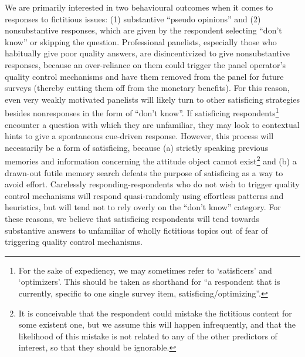 \documentclass[Royal,times,sageh]{sagej}
\begin{document}
We are primarily interested in two behavioural outcomes when it comes to
responses to fictitious issues: (1) substantive ``pseudo opinions'' and
(2) nonsubstantive responses, which are given by the respondent
selecting ``don't know'' or skipping the question. Professional
panelists, especially those who habitually give poor quality answers,
are disincentivized to give nonsubstantive responses, because an
over-reliance on them could trigger the panel operator's quality control
mechanisms and have them removed from the panel for future surveys
(thereby cutting them off from the monetary benefits). For this reason,
even very weakly motivated panelists will likely turn to other
satisficing strategies besides nonresponses in the form of ``don't
know''. If satisficing respondents\footnote{For the sake of expediency,
  we may sometimes refer to `satisficers' and `optimizers'. This should
  be taken as shorthand for ``a respondent that is currently, specific
  to one single survey item, satisficing/optimizing''.} encounter a
question with which they are unfamiliar, they may look to contextual
hints to give a spontaneous cue-driven response. However, this process
will necessarily be a form of satisficing, because (a) strictly speaking
previous memories and information concerning the attitude object cannot
exist\footnote{It is conceivable that the respondent could mistake the
  fictitious content for some existent one, but we assume this will
  happen infrequently, and that the likelihood of this mistake is not
  related to any of the other predictors of interest, so that they
  should be ignorable.} and (b) a drawn-out futile memory search defeats
the purpose of satisficing as a way to avoid effort. Carelessly
responding-respondents who do not wish to trigger quality control
mechanisms will respond quasi-randomly using effortless patterns and
heuristics, but will tend not to rely overly on the ``don't know''
category. For these reasons, we believe that satisficing respondents
will tend towards substantive answers to unfamiliar of wholly fictitious
topics out of fear of triggering quality control mechanisms.
\end{document}

